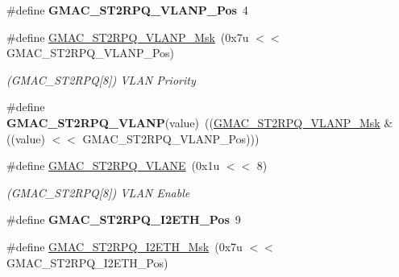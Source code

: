 \begin{DoxyCompactItemize}
\item 
\mbox{\label{group__SAME70__GMAC_ga9113c7696d38afcf3590458688ab92a6}} 
\#define {\bfseries G\+M\+A\+C\+\_\+\+S\+T2\+R\+P\+Q\+\_\+\+V\+L\+A\+N\+P\+\_\+\+Pos}~4
\item 
\mbox{\label{group__SAME70__GMAC_ga3797e86207092cb999b1aafb46c20acb}} 
\#define \mbox{\hyperlink{group__SAME70__GMAC_ga3797e86207092cb999b1aafb46c20acb}{G\+M\+A\+C\+\_\+\+S\+T2\+R\+P\+Q\+\_\+\+V\+L\+A\+N\+P\+\_\+\+Msk}}~(0x7u $<$$<$ G\+M\+A\+C\+\_\+\+S\+T2\+R\+P\+Q\+\_\+\+V\+L\+A\+N\+P\+\_\+\+Pos)
\begin{DoxyCompactList}\small\item\em (G\+M\+A\+C\+\_\+\+S\+T2\+R\+PQ\mbox{[}8\mbox{]}) V\+L\+AN Priority \end{DoxyCompactList}\item 
\mbox{\label{group__SAME70__GMAC_gaed806f82d3f84f5859a1a9e9de3f2bc2}} 
\#define {\bfseries G\+M\+A\+C\+\_\+\+S\+T2\+R\+P\+Q\+\_\+\+V\+L\+A\+NP}(value)~((\mbox{\hyperlink{group__SAMV71__GMAC_ga3797e86207092cb999b1aafb46c20acb}{G\+M\+A\+C\+\_\+\+S\+T2\+R\+P\+Q\+\_\+\+V\+L\+A\+N\+P\+\_\+\+Msk}} \& ((value) $<$$<$ G\+M\+A\+C\+\_\+\+S\+T2\+R\+P\+Q\+\_\+\+V\+L\+A\+N\+P\+\_\+\+Pos)))
\item 
\mbox{\label{group__SAME70__GMAC_ga510bf5ff8627ee99859acde527d5d86c}} 
\#define \mbox{\hyperlink{group__SAME70__GMAC_ga510bf5ff8627ee99859acde527d5d86c}{G\+M\+A\+C\+\_\+\+S\+T2\+R\+P\+Q\+\_\+\+V\+L\+A\+NE}}~(0x1u $<$$<$ 8)
\begin{DoxyCompactList}\small\item\em (G\+M\+A\+C\+\_\+\+S\+T2\+R\+PQ\mbox{[}8\mbox{]}) V\+L\+AN Enable \end{DoxyCompactList}\item 
\mbox{\label{group__SAME70__GMAC_ga18510840a4bfd17d21f6a9b6a850230a}} 
\#define {\bfseries G\+M\+A\+C\+\_\+\+S\+T2\+R\+P\+Q\+\_\+\+I2\+E\+T\+H\+\_\+\+Pos}~9
\item 
\mbox{\label{group__SAME70__GMAC_gac6148f138674902973da48d5a22d826e}} 
\#define \mbox{\hyperlink{group__SAME70__GMAC_gac6148f138674902973da48d5a22d826e}{G\+M\+A\+C\+\_\+\+S\+T2\+R\+P\+Q\+\_\+\+I2\+E\+T\+H\+\_\+\+Msk}}~(0x7u $<$$<$ G\+M\+A\+C\+\_\+\+S\+T2\+R\+P\+Q\+\_\+\+I2\+E\+T\+H\+\_\+\+Pos)

\end{DoxyCompactItemize}
